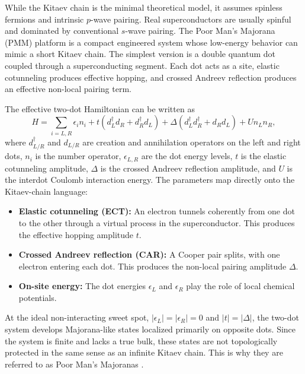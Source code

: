 While the Kitaev chain is the minimal theoretical model, it assumes spinless fermions and intrinsic $p$-wave pairing. Real superconductors are usually spinful and dominated by conventional $s$-wave pairing. The Poor Man's Majorana (PMM) platform is a compact engineered system whose low-energy behavior can mimic a short Kitaev chain. The simplest version is a double quantum dot coupled through a superconducting segment. Each dot acts as a site, elastic cotunneling produces effective hopping, and crossed Andreev reflection produces an effective non-local pairing term.

The effective two-dot Hamiltonian can be written as
\begin{equation}
H = \sum_{i=L,R} \epsilon_i n_i
+ t (d_L^\dagger d_R + d_R^\dagger d_L)
+ \Delta (d_L^\dagger d_R^\dagger + d_R d_L)
+ U n_L n_R,
\label{eq:qdsqdh}
\end{equation}
where $d_{L/R}^\dagger$ and $d_{L/R}$ are creation and annihilation operators on the left and right dots, $n_i$ is the number operator, $\epsilon_{L,R}$ are the dot energy levels, $t$ is the elastic cotunneling amplitude, $\Delta$ is the crossed Andreev reflection amplitude, and $U$ is the interdot Coulomb interaction energy. The parameters map directly onto the Kitaev-chain language:
\begin{itemize}
    \item \textbf{Elastic cotunneling (ECT):} An electron tunnels coherently from one dot to the other through a virtual process in the superconductor. This produces the effective hopping amplitude $t$.
    \item \textbf{Crossed Andreev reflection (CAR):} A Cooper pair splits, with one electron entering each dot. This produces the non-local pairing amplitude $\Delta$.
    \item \textbf{On-site energy:} The dot energies $\epsilon_L$ and $\epsilon_R$ play the role of local chemical potentials.
\end{itemize}
At the ideal non-interacting sweet spot, $|\epsilon_L|=|\epsilon_R|=0$ and $|t|=|\Delta|$, the two-dot system develops Majorana-like states localized primarily on opposite dots. Since the system is finite and lacks a true bulk, these states are not topologically protected in the same sense as an infinite Kitaev chain. This is why they are referred to as Poor Man's Majoranas \cite{aguadoNewTrendsPlatforms2024}.\\

